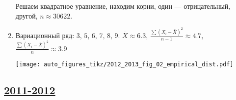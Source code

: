 \begin{enumerate}
Решаем квадратное уравнение, находим корни, один — отрицательный, другой, $n\approx 30622$.
\item

Вариационный ряд: $3$, $5$, $6$, $7$, $8$, $9$. $\bar{X}\approx 6.3$,
$\frac{\sum (X_i-\bar{X})^2}{n-1}\approx 4.7$,
$\frac{\sum (X_i-\bar{X})^2}{n}\approx 3.9$


\begin{minipage}{0.6\textwidth}
\begin{center}
\texttt{[image: auto\_figures\_tikz/2012\_2013\_fig\_02\_empirical\_dist.pdf]}
\end{center}
\end{minipage}
\end{enumerate}



\subsection[2011-2012]{\hyperref[sec:kr_02_2011_2012]{2011-2012}}
\label{sec:sol_kr_02_2011_2012}

